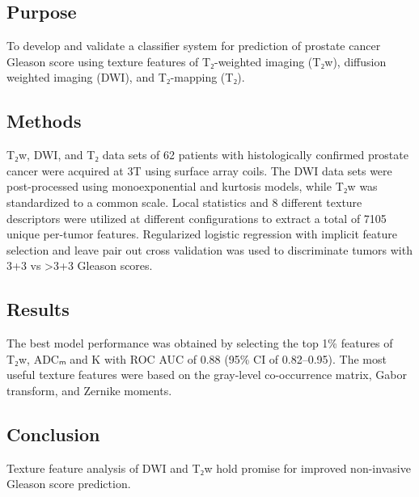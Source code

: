 
\subsection*{Purpose}

To develop and validate a classifier system for prediction of prostate cancer
Gleason score using texture features of T₂-weighted imaging (T₂w), diffusion
weighted imaging (DWI), and T₂-mapping (T₂).


\subsection*{Methods}

T₂w, DWI, and T₂ data sets of 62 patients with histologically confirmed prostate
cancer were acquired at 3T using surface array coils. The DWI data sets were
post-processed using monoexponential and kurtosis models, while T₂w was
standardized to a common scale. Local statistics and 8 different texture
descriptors were utilized at different configurations to extract a total of
7105 unique per-tumor features. Regularized logistic regression with implicit
feature selection and leave pair out cross validation was used to discriminate
tumors with 3+3 vs >3+3 Gleason scores.


\subsection*{Results}

The best model performance was obtained by selecting the top 1\% features of
T₂w, ADCₘ and K with ROC AUC of 0.88 (95\% CI of 0.82--0.95). The most useful
texture features were based on the gray-level co-occurrence matrix, Gabor
transform, and Zernike moments.


\subsection*{Conclusion}

Texture feature analysis of DWI and T₂w hold promise for improved non-invasive
Gleason score prediction.
